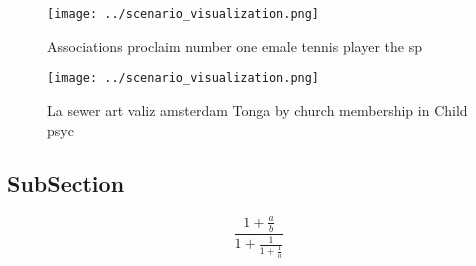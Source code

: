 \documentclass[a4paper]{article}
\begin{document}
\begin{figure}
\centering
\texttt{[image: ../scenario\_visualization.png]}
\caption{Associations proclaim number one emale tennis player the sp
}
\end{figure}
 
\begin{figure}
\centering
\texttt{[image: ../scenario\_visualization.png]}
\caption{La sewer art valiz amsterdam Tonga by church membership in Child psyc
}
\end{figure}
 
\subsection{SubSection}

\[ \frac{1+\frac{a}{b}}{1+\frac{1}{1+\frac{1}{a}}} \]
\end{document}
